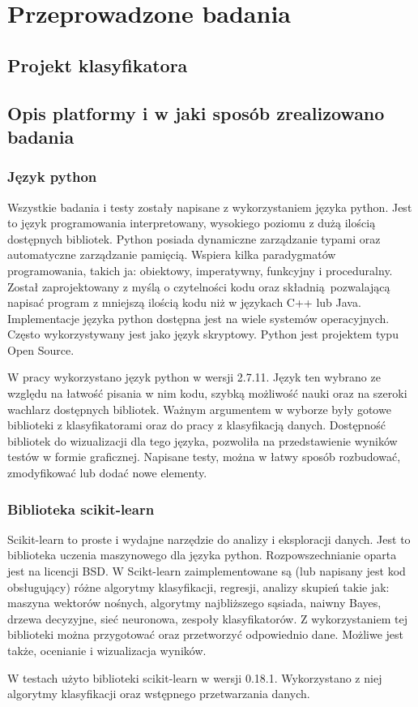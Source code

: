 


\chapter{Przeprowadzone badania}
\section{Projekt klasyfikatora}

\section{Opis platformy i w jaki sposób zrealizowano badania}

\subsection{Język python}
Wszystkie badania i testy zostały napisane z wykorzystaniem języka python. Jest to język programowania interpretowany, wysokiego poziomu z dużą ilością dostępnych bibliotek. Python\cite{python} posiada dynamiczne zarządzanie typami oraz automatyczne zarządzanie pamięcią. Wspiera kilka paradygmatów programowania, takich ja: obiektowy, imperatywny, funkcyjny i proceduralny. Został zaprojektowany z myślą o czytelności kodu oraz składnią pozwalającą napisać program z mniejszą ilością kodu niż w językach C++ lub Java. Implementacje języka python dostępna jest na wiele systemów operacyjnych. Często wykorzystywany jest jako język skryptowy. Python jest projektem typu Open Source. \par
W pracy wykorzystano język python w wersji 2.7.11. Język ten wybrano ze względu na łatwość pisania w nim kodu, szybką możliwość nauki oraz na szeroki wachlarz dostępnych bibliotek. Ważnym argumentem w wyborze były gotowe biblioteki z klasyfikatorami oraz do pracy z klasyfikacją danych. Dostępność bibliotek do wizualizacji dla tego języka, pozwoliła na przedstawienie wyników testów w formie graficznej. Napisane testy, można w łatwy sposób rozbudować, zmodyfikować lub dodać nowe elementy.    

\subsection{Biblioteka scikit-learn}
Scikit-learn\cite{scikit} to proste i wydajne narzędzie do analizy i eksploracji danych. Jest to biblioteka uczenia maszynowego dla języka python. Rozpowszechnianie oparta jest na licencji BSD. W Scikt-learn zaimplementowane są (lub napisany jest kod obsługujący) różne algorytmy klasyfikacji, regresji, analizy skupień takie jak: maszyna wektorów nośnych, algorytmy najbliższego sąsiada, naiwny Bayes, drzewa decyzyjne, sieć neuronowa, zespoły klasyfikatorów. Z wykorzystaniem tej biblioteki można przygotować oraz przetworzyć odpowiednio dane. Możliwe jest także, ocenianie i wizualizacja wyników. \par
W testach użyto biblioteki scikit-learn w wersji 0.18.1. Wykorzystano z niej algorytmy klasyfikacji oraz wstępnego przetwarzania danych.
